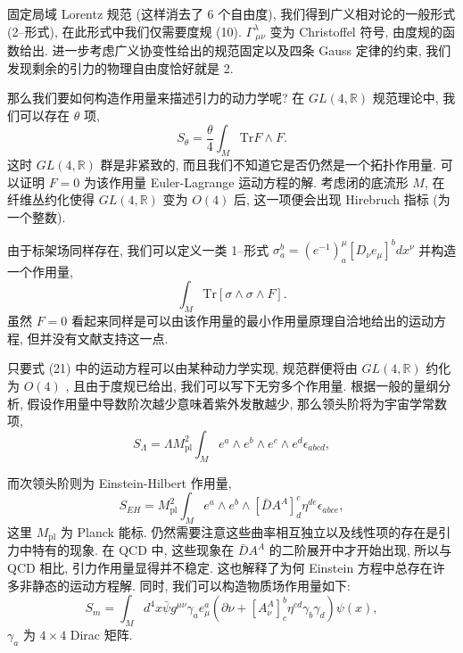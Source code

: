 \documentclass{article}
\begin{document}
固定局域 Lorentz 规范 (这样消去了 6 个自由度), 我们得到广义相对论的一般形式 (2--形式), 在此形式中我们仅需要度规 (10). $\Gamma_{\ \mu\nu}^{\lambda}$ 变为 Christoffel 符号, 由度规的函数给出. 进一步考虑广义协变性给出的规范固定以及四条 Gauss 定律的约束, 我们发现剩余的引力的物理自由度恰好就是 2.

那么我们要如何构造作用量来描述引力的动力学呢? 在 $GL(4,\mathbb{R})$ 规范理论中, 我们可以存在 $\theta$ 项,
\begin{equation}
S_{\theta}=\frac{\theta}{4}\int_{M} \text{Tr} F\wedge F.
\end{equation}
这时 $GL(4, \mathbb{R})$ 群是非紧致的, 而且我们不知道它是否仍然是一个拓扑作用量. 可以证明 $F=0$ 为该作用量 Euler-Lagrange 运动方程的解. 考虑闭的底流形 $M$, 在纤维丛约化使得  $GL(4, \mathbb{R})$ 变为  $O(4)$ 后, 这一项便会出现 Hirebruch 指标 (为一个整数).

由于标架场同样存在, 我们可以定义一类 1--形式 $\sigma_{a}^{b}=(e^{-1})_{a}^{\mu}[D_{\nu}e_{\mu}]^{b}dx^{\nu}$ 并构造一个作用量,
\begin{equation}
\int_{M} \textrm{Tr}[\sigma\wedge\sigma\wedge F].
\end{equation}
虽然 $F=0$ 看起来同样是可以由该作用量的最小作用量原理自洽地给出的运动方程, 但并没有文献支持这一点.

只要式 (21) 中的运动方程可以由某种动力学实现, 规范群便将由 $GL(4, \mathbb{R})$ 约化为  $O(4)$ , 且由于度规已给出, 我们可以写下无穷多个作用量. 根据一般的量纲分析, 假设作用量中导数阶次越少意味着紫外发散越少, 那么领头阶将为宇宙学常数项,
\begin{equation}
S_{\Lambda}=\Lambda M^{2}_{\textrm{pl}}\int_{M}e^{a}\wedge e^{b} \wedge e^{c} \wedge e^{d} \epsilon_{abcd},
\end{equation}

而次领头阶则为 Einstein-Hilbert 作用量,
\begin{equation}
S_{EH}=M^{2}_{\textrm{pl}}\int_{M}e^{a}\wedge e^{b} \wedge [\bar{D}A^{A}]_{d}^{c} \eta^{de}\epsilon_{abce},
\end{equation}
这里 $M_{\textrm{pl}}$ 为 Planck 能标. 仍然需要注意这些曲率相互独立以及线性项的存在是引力中特有的现象. 在 QCD 中, 这些现象在 $\bar{D}A^{A}$ 的二阶展开中才开始出现, 所以与 QCD 相比, 引力作用量显得并不稳定. 这也解释了为何 Einstein 方程中总存在许多非静态的运动方程解. 同时, 我们可以构造物质场作用量如下:
\begin{equation}
S_{m}=\int_{M}d^{4}x\bar{\psi}g^{\mu\nu}\gamma_{a}e^{a}_{\mu}(\partial\nu+[A_{\nu}^{A}]^{b}_{c}\eta^{cd}\gamma_{b}\gamma_{d})\psi(x),
\end{equation}
$\gamma_{a}$ 为 $4\times 4$ Dirac 矩阵.
\end{document}
